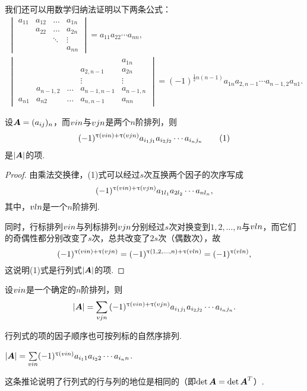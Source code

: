 我们还可以用数学归纳法证明以下两条公式：
\begin{gather}
\begin{vmatrix}
a_{11} & a_{12} & \dots & a_{1n} \\
& a_{22} & \dots & a_{2n} \\
& & \ddots & \vdots \\
& & & a_{nn}
\end{vmatrix}
= a_{11} a_{22} \dotsm a_{nn}, \\
\begin{vmatrix}
& & & & a_{1n} \\
& & & a_{2,n-1} & a_{2n} \\
& & & \vdots & \vdots \\
& a_{n-1,2} & \dots & a_{n-1,n-1} & a_{n-1,n} \\
a_{n1} & a_{n2} & \dots & a_{n,n-1} & a_{nn}
\end{vmatrix}
=(-1)^{\frac{1}{2}n(n-1)} a_{1n} a_{2,n-1} \dotsm a_{n-1,2} a_{n1}.
\end{gather}

\begin{lemma}
设\(\boldsymbol{A}=(a_{ij})_n\)，而\(v{i}{n}\)与\(v{j}{n}\)是两个\(n\)阶排列，则\begin{gather}
(-1)^{\tau(\v{i}{n})+\tau(\v{j}{n})}
	a_{i_1j_1} a_{i_2j_2} \dotsm a_{i_nj_n} \tag1
\end{gather}是\(\abs{\boldsymbol{A}}\)的项.
\begin{proof}
由乘法交换律，(1)式可以经过\(s\)次互换两个因子的次序写成\[
(-1)^{\uptau(v{i}{n})+\uptau(v{j}{n})}
	a_{1 l_1} a_{2 l_2} \dotsm a_{n l_n},
\]其中，\(v{l}{n}\)是一个\(n\)阶排列.

同时，行标排列\(v{i}{n}\)与列标排列\(v{j}{n}\)分别经过\(s\)次对换变到\(1,2,\dotsc,n\)与\(v{l}{n}\)，而它们的奇偶性都分别改变了\(s\)次，总共改变了\(2s\)次（偶数次），故\[
(-1)^{\uptau(v{i}{n})+\uptau(v{j}{n})}
= (-1)^{\uptau(1,2,\dotsc,n)+\uptau(v{l}{n})}
= (-1)^{\uptau(v{l}{n})},
\]这说明(1)式是行列式\(\abs{\boldsymbol{A}}\)的项.
\end{proof}
\end{lemma}

\begin{corollary}
设\(v{i}{n}\)是一个确定的\(n\)阶排列，则\[
\abs{\boldsymbol{A}} = \sum\limits_{v{j}{n}}{
	(-1)^{\uptau(v{i}{n})+\uptau(v{j}{n})} a_{i_1 j_1} a_{i_2 j_2} \dotsm a_{i_n j_n}
}.
\]
\end{corollary}

行列式的项的因子顺序也可按列标的自然序排列.
\begin{corollary}
\(\abs{\boldsymbol{A}} =
\sum\limits_{v{i}{n}}
(-1)^{\uptau(v{i}{n})} a_{i_1 1} a_{i_2 2} \dotsm a_{i_n n}\).
\end{corollary}
这条推论说明了行列式的行与列的地位是相同的（即\(\det\boldsymbol{A} = \det\boldsymbol{A}^T\)）.

